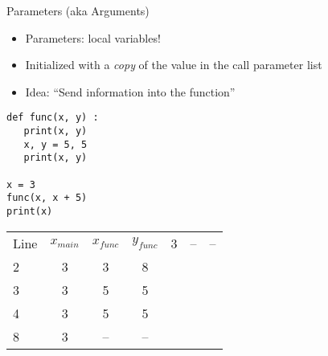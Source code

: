 
\begin{frame}[fragile]{Parameters (aka Arguments)}
%
\begin{itemize}
\item Parameters: local variables!
\item Initialized with a \emph{copy} of the value in the call parameter list
\item Idea: \enquote{Send information into the function}
\end{itemize}
%
\vspace{5pt}
\begin{tcbraster}[raster columns=2,
                  raster equal height,
                  nobeforeafter,
                  raster column skip=0.5cm]
\begin{codebox}
\begin{verbatim}
def func(x, y) :
   print(x, y)
   x, y = 5, 5
   print(x, y)

x = 3
func(x, x + 5)
print(x)   
\end{verbatim}
\end{codebox}
%
\begin{tcolorbox}[title=Evolution of Values]
\scriptsize
\begin{center}
\begin{tabular}{l|ccc}
Line & $x_{main}$ & $x_{func}$ & $y_{func}$  & 3 & -- & -- \\
2 & 3 &  3 &  8 \\
3 & 3 &  5 &  5 \\
4 & 3 &  5 &  5 \\
8 & 3 & -- & --
\end{tabular}
\end{center}
\end{tcolorbox}
\end{tcbraster}
%
\end{frame}


